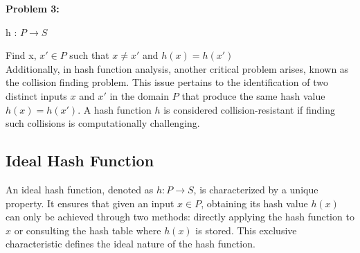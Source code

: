 \documentclass[11pt]{article}
\begin{document}
\newline
\textbf{Problem 3:}\\
\begin{center}
    h : $ P \rightarrow S$
\end{center}
Find x, $x' \in P$ such that $x \neq x'$ and $h(x) = h(x')$\\
\newline
Additionally, in hash function analysis, another critical problem arises, known as the collision finding problem. This issue pertains to the identification of two distinct inputs \( x \) and \( x' \) in the domain \( P \) that produce the same hash value \( h(x) = h(x') \). A hash function \( h \) is considered collision-resistant if finding such collisions is computationally challenging.

\subsection{Ideal Hash Function}
An ideal hash function, denoted as \( h : P \rightarrow S \), is characterized by a unique property. It ensures that given an input \( x \in P \), obtaining its hash value \( h(x) \) can only be achieved through two methods: directly applying the hash function to \( x \) or consulting the hash table where \( h(x) \) is stored. This exclusive characteristic defines the ideal nature of the hash function.
\end{document}
